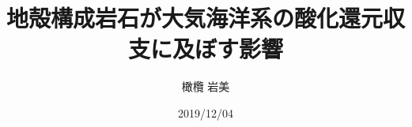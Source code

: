 \documentclass[a4paper,uplatex,dvipdfmx]{jsarticle}
\title{地殻構成岩石が大気海洋系の酸化還元収支に及ぼす影響}
\author{橄欖 岩美}
\date{2019/12/04}
\begin{document}
\begin{titlepage}
\epmaketitle
\thispagestyle{empty}
\end{titlepage}
\end{document}
